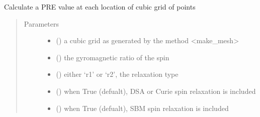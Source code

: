 \documentclass[a4paper,10pt,english,openany,oneside]{sphinxmanual}
\begin{document}
\begin{fulllineitems}
\begin{fulllineitems}
\begin{fulllineitems}
\label{\detokenize{reference/generated/paramagpy.metal.Metal.pre_mesh:paramagpy.metal.Metal.pre_mesh}}
Calculate a PRE value at each location of cubic grid of points
\begin{quote}\begin{description}
\item[{Parameters}] \leavevmode\begin{itemize}
\item {} 
 (\sphinxstyleliteralemphasis{\sphinxupquote{ (}}\sphinxstyleliteralemphasis{\sphinxupquote{,}}\sphinxstyleliteralemphasis{\sphinxupquote{,}}\sphinxstyleliteralemphasis{\sphinxupquote{,}}\sphinxstyleliteralemphasis{\sphinxupquote{)}}) \textendash{} a cubic grid as generated by the method \textless{}make\_mesh\textgreater{}

\item {} 
 () \textendash{} the gyromagnetic ratio of the spin

\item {} 
 () \textendash{} either ‘r1’ or ‘r2’, the relaxation type

\item {} 
 (\sphinxstyleliteralemphasis{\sphinxupquote{ (}}\sphinxstyleliteralemphasis{\sphinxupquote{)}}) \textendash{} when True (defualt), DSA or Curie spin relaxation is included

\item {} 
 (\sphinxstyleliteralemphasis{\sphinxupquote{ (}}\sphinxstyleliteralemphasis{\sphinxupquote{)}}) \textendash{} when True (defualt), SBM spin relaxation is included


\end{itemize}
\end{description}
\end{quote}
\end{fulllineitems}
\end{fulllineitems}
\end{fulllineitems}
\end{document}
